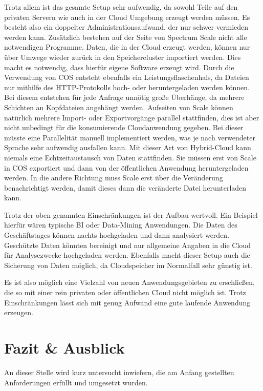 Trotz allem ist das gesamte Setup sehr aufwendig, da sowohl Teile auf den privaten Servern wie auch in der Cloud Umgebung erzeugt werden müssen. Es besteht also ein doppelter Administrationsaufwand, der nur schwer vermieden werden kann. 
Zusätzlich bestehen auf der Seite von Spectrum Scale nicht alle notwendigen Programme. Daten, die in der Cloud erzeugt werden, können nur über Umwege wieder zurück in den Speichercluster importiert werden. Dies macht es notwendig, dass hierfür eigene Software erzeugt wird.
Durch die Verwendung von \ac{COS} entsteht ebenfalls ein Leistungsflaschenhals, da Dateien nur mithilfe des HTTP-Protokolls hoch- oder heruntergeladen werden können. Bei diesem entstehen für jede Anfrage unnötig große Überhänge, da mehrere Schichten an Kopfdateien angehängt werden. Aufseiten von Scale können natürlich mehrere Import- oder Exportvorgänge parallel stattfinden, dies ist aber nicht unbedingt für die konsumierende Cloudanwendung gegeben. Bei dieser müsste eine Parallelität manuell implementiert werden, was je nach verwendeter Sprache sehr aufwendig ausfallen kann.
Mit dieser Art von Hybrid-Cloud kann niemals eine Echtzeitaustausch von Daten stattfinden. Sie müssen erst von Scale in \ac{COS} exportiert und dann von der öffentlichen Anwendung heruntergeladen werden. In die andere Richtung muss Scale erst über die Veränderung benachrichtigt werden, damit dieses dann die veränderte Datei herunterladen kann.

Trotz der oben genannten Einschränkungen ist der Aufbau wertvoll. Ein Beispiel hierfür wären typische \ac{BI} oder Data-Mining Anwendungen. Die Daten des Geschäftstages können nachts hochgeladen und dann analysiert werden.
Geschützte Daten könnten bereinigt und nur allgemeine Angaben in die Cloud für Analysezwecke hochgeladen werden.
Ebenfalls macht dieser Setup auch die Sicherung von Daten möglich, da Cloudspeicher im Normalfall sehr günstig ist.

Es ist also möglich eine Vielzahl von neuen Anwendungsgebieten zu erschließen, die so mit einer rein privaten oder öffentlichen Cloud nicht möglich ist. Trotz Einschränkungen lässt sich mit genug Aufwand eine gute laufende Anwendung erzeugen. 
\section{Fazit \& Ausblick}

An dieser Stelle wird kurz untersucht inwiefern, die am Anfang gestellten Anforderungen erfüllt und umgesetzt wurden.

